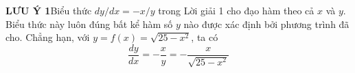 \begin{minipage}[t]{0.73\textwidth}
\bigskip
\noindent\textbf{\textsf{\color{stewartgreen}LƯU Ý 1}}\hspace{1em}Biểu thức $dy/dx = -x/y$ trong Lời giải 1 cho đạo hàm theo cả $x$ và $y$. Biểu thức này luôn đúng bất kể hàm số $y$ nào được xác định bởi phương trình đã cho. Chẳng hạn, với $y = f(x) = \sqrt{25 - x^2}$, ta có
\[
\frac{dy}{dx} = -\frac{x}{y} = -\frac{x}{\sqrt{25 - x^2}}
\]

\end{minipage}
